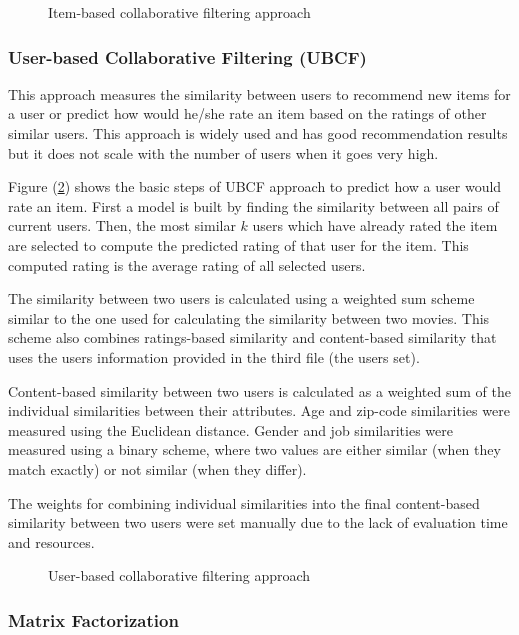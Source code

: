 \documentclass{sigish}
\begin{document}
\begin{figure}
	\centering
	\caption{Item-based collaborative filtering approach}
	\label{fig:ibcf_approach}
\end{figure}

\subsubsection{User-based Collaborative Filtering (UBCF)}

This approach measures the similarity between users to recommend new items for a user or predict how would he/she rate an item based on the ratings of other similar users. This approach is widely used and has good recommendation results but it does not scale with the number of users when it goes very high.

Figure (\ref{fig:ubcf_approach}) shows the basic steps of UBCF approach to predict how a user would rate an item. First a model is built by finding the similarity between all pairs of current users. Then, the most similar $ k $ users which have already rated the item are selected to compute the predicted rating of that user for the item. This computed rating is the average rating of all selected users.

The similarity between two users is calculated using a weighted sum scheme similar to the one used for calculating the similarity between two movies. This scheme also combines ratings-based similarity and content-based similarity that uses the users information provided in the third file (the users set).

Content-based similarity between two users is calculated as a weighted sum of the individual similarities between their attributes. Age and zip-code similarities were measured using the Euclidean distance. Gender and job similarities were measured using a binary scheme, where two values are either similar (when they match exactly) or not similar (when they differ).

The weights for combining individual similarities into the final content-based similarity between two users were set manually due to the lack of evaluation time and resources.

\begin{figure}
	\centering
	\caption{User-based collaborative filtering approach}
	\label{fig:ubcf_approach}
\end{figure}

\subsubsection{Matrix Factorization}
\end{document}
